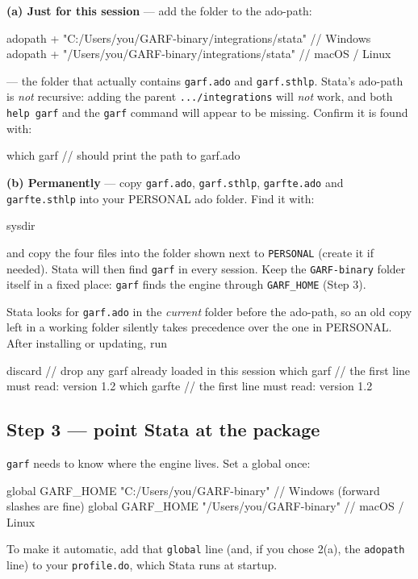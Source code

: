 \documentclass[11pt,a4paper]{article}
\newcommand{\code}[1]{\texttt{#1}}
\begin{document}
\textbf{(a) Just for this session} --- add the folder to the ado-path:
\begin{stata}
adopath + "C:/Users/you/GARF-binary/integrations/stata"   // Windows
adopath + "/Users/you/GARF-binary/integrations/stata"     // macOS / Linux
\end{stata}

\medskip
\noindent{\color{accent}\textbf{The path must end in \code{/stata}}} --- the folder that
actually contains \code{garf.ado} and \code{garf.sthlp}. Stata's ado-path is \emph{not}
recursive: adding the parent \code{.../integrations} will \emph{not} work, and both
\code{help garf} and the \code{garf} command will appear to be missing. Confirm it is found
with:
\begin{stata}
which garf     // should print the path to garf.ado
\end{stata}

\textbf{(b) Permanently} --- copy \code{garf.ado}, \code{garf.sthlp}, \code{garfte.ado} and
\code{garfte.sthlp} into your PERSONAL ado folder. Find it with:
\begin{stata}
sysdir
\end{stata}
and copy the four files into the folder shown next to \code{PERSONAL} (create it if needed).
Stata will then find \code{garf} in every session. Keep the \code{GARF-binary} folder itself in a
fixed place: \code{garf} finds the engine through \code{GARF\_HOME} (Step 3).

\medskip
{} Stata looks for \code{garf.ado} in
the \emph{current} folder before the ado-path, so an old copy left in a working folder silently
takes precedence over the one in PERSONAL. After installing or updating, run
\begin{stata}
discard        // drop any garf already loaded in this session
which garf     // the first line must read: version 1.2
which garfte   // the first line must read: version 1.2
\end{stata}

\subsection{Step 3 --- point Stata at the package}
\code{garf} needs to know where the engine lives. Set a global once:
\begin{stata}
global GARF_HOME "C:/Users/you/GARF-binary"   // Windows (forward slashes are fine)
global GARF_HOME "/Users/you/GARF-binary"     // macOS / Linux
\end{stata}
To make it automatic, add that \code{global} line (and, if you chose 2(a), the \code{adopath}
line) to your \code{profile.do}, which Stata runs at startup.
\end{document}
